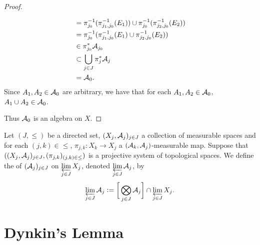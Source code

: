 \documentclass{book}
\begin{document}
\begin{proof}
\begin{enumerate}
\begin{align*}
			& = \pi_{j_0}^{-1}(\pi_{j_1, j_0}^{-1}(E_1)) \cup \pi_{j_0}^{-1}(\pi_{j_2, j_0}^{-1}(E_2)) \\
			& = \pi_{j_0}^{-1}(\pi_{j_1, j_0}^{-1}(E_1) \cup \pi_{j_2, j_0}^{-1}(E_2)) \\
			& \in \pi_{j_0}^*\mathcal{A}_{j_0} \\
			& \subset \bigcup\limits_{j \in J} \pi_j^*\mathcal{A}_j \\
			& = \mathcal{A}_0.
		\end{align*}
		Since $A_1, A_2 \in \mathcal{A}_0$ are arbitrary, we have that for each $A_1, A_2 \in \mathcal{A}_0$, $A_1 \cup A_2 \in \mathcal{A}_0$.
	\end{enumerate}
	Thus $\mathcal{A}_0$ is an algebra on $X$.
\end{proof}

\begin{defn} 
	Let $(J, \leq)$ be a directed set, $(X_j, \mathcal{A}_j)_{j \in J}$ a collection of measurable spaces and for each $(j,k) \in \leq$, $\pi_{j,k}:X_k \rightarrow X_j$ a $(\mathcal{A}_k, \mathcal{A}_j)$-measurable map. Suppose that $((X_j, \mathcal{A}_j)_{j \in J}, (\pi_{j,k})_{(j,k) \in \leq})$ is a projective system of topological spaces. We define the  of $(\mathcal{A}_j)_{j \in J}$ on $\varprojlim\limits_{j \in J} X_j$, denoted $\varprojlim\limits_{j \in J} \mathcal{A}_j$, by $$\varprojlim\limits_{j \in J} \mathcal{A}_j \vcentcolon= \bigg[ \bigotimes\limits_{j \in J} \mathcal{A}_j \bigg] \cap \varprojlim\limits_{j \in J} X_j.$$
\end{defn}




















	
	
	
	
	
	
	
	
	
	
	
	
	
	
	
	
	
	
	
	
	
	
	\newpage
	\section{Dynkin's Lemma}
	
\end{document}
